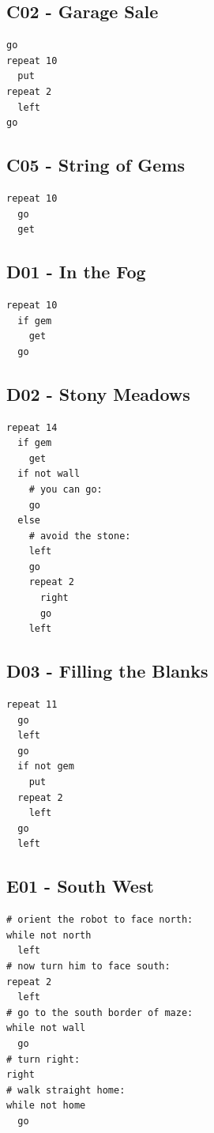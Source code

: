 \documentclass[article,A4,12pt]{llncs}
\begin{document}
\subsection{C02 - Garage Sale}
\begin{verbatim}
go
repeat 10
  put
repeat 2
  left
go
\end{verbatim}

\subsection{C05 - String of Gems}
\begin{verbatim}
repeat 10
  go
  get
\end{verbatim}

\subsection{D01 - In the Fog}
\begin{verbatim}
repeat 10
  if gem
    get
  go
\end{verbatim}

\subsection{D02 - Stony Meadows}
\begin{verbatim}
repeat 14
  if gem
    get
  if not wall
    # you can go:
    go
  else
    # avoid the stone:
    left
    go
    repeat 2
      right
      go
    left
\end{verbatim}

\subsection{D03 - Filling the Blanks}
\begin{verbatim}
repeat 11
  go
  left
  go
  if not gem
    put
  repeat 2
    left
  go
  left
\end{verbatim}


\subsection{E01 - South West}
\begin{verbatim}
# orient the robot to face north:
while not north
  left
# now turn him to face south:
repeat 2
  left
# go to the south border of maze:
while not wall
  go
# turn right:
right
# walk straight home:
while not home
  go
\end{verbatim}
\end{document}
